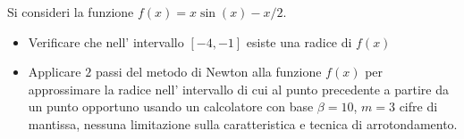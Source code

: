 Si consideri la funzione $f(x)=x \sin(x)-x/2$.
\begin{itemize}
\item Verificare che nell' intervallo $[-4, -1]$ esiste una radice di $f(x)$
\item Applicare $2$ passi del metodo di Newton alla funzione $f(x)$ per approssimare la radice nell' intervallo di cui al punto precedente a partire da un punto opportuno
usando un calcolatore con base $\beta =10$, $m=3$ cifre di
mantissa, nessuna limitazione sulla caratteristica e tecnica di
arrotondamento.
\end{itemize}
